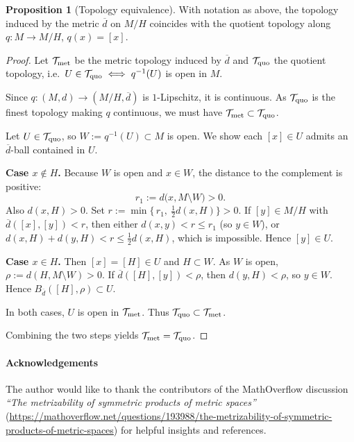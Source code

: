 \documentclass[10pt,a4paper]{article}
\theoremstyle{definition}
\newtheorem{proposition}[theorem]{Proposition}
\begin{document}
\begin{proposition}[Topology equivalence]\label{prop:quot-top=metric-top}
With notation as above, the topology induced by the metric $\overline d$ on $M/H$ coincides with the quotient topology along $q:M\to M/H$, $q(x)=[x]$.
\end{proposition}

\begin{proof}
Let $\mathcal T_{\rm met}$ be the metric topology induced by $\overline d$ and $\mathcal T_{\rm quo}$ the quotient topology, i.e.\ $U\in\mathcal T_{\rm quo}\iff q^{-1}(U)$ is open in $M$.


Since $q:(M,d)\to(M/H,\overline d)$ is $1$-Lipschitz, it is continuous. As $\mathcal T_{\rm quo}$ is the finest topology making $q$ continuous, we must have $\mathcal T_{\rm met}\subset \mathcal T_{\rm quo}$.


Let $U\in\mathcal T_{\rm quo}$, so $W:=q^{-1}(U)\subset M$ is open. We show each $[x]\in U$ admits an $\overline d$-ball contained in $U$.

\noindent\textbf{Case $x\notin H$.}  
Because $W$ is open and $x\in W$, the distance to the complement is positive:
\[
r_1:=d\big(x,M\setminus W\big)>0.
\]
Also $d(x,H)>0$. Set $r:=\min\{\,r_1,\ \tfrac{1}{2}d(x,H)\}>0$. If $[y]\in M/H$ with $\overline d([x],[y])<r$, then either $d(x,y)<r\le r_1$ (so $y\in W$), or $d(x,H)+d(y,H)<r\le \tfrac12 d(x,H)$, which is impossible. Hence $[y]\in U$.

\noindent\textbf{Case $x\in H$.}  
Then $[x]=[H]\in U$ and $H\subset W$. As $W$ is open, $\rho:=d(H,M\setminus W)>0$. If $\overline d([H],[y])<\rho$, then $d(y,H)<\rho$, so $y\in W$. Hence $B_{\overline d}([H],\rho)\subset U$.

In both cases, $U$ is open in $\mathcal T_{\rm met}$. Thus $\mathcal T_{\rm quo}\subset \mathcal T_{\rm met}$.

Combining the two steps yields $\mathcal T_{\rm met}=\mathcal T_{\rm quo}$.
\end{proof}

\paragraph*{Acknowledgements}
The author would like to thank the contributors of the MathOverflow discussion 
\emph{``The metrizability of symmetric products of metric spaces''} 
(\url{https://mathoverflow.net/questions/193988/the-metrizability-of-symmetric-products-of-metric-spaces}) 
for helpful insights and references.





\end{document}
